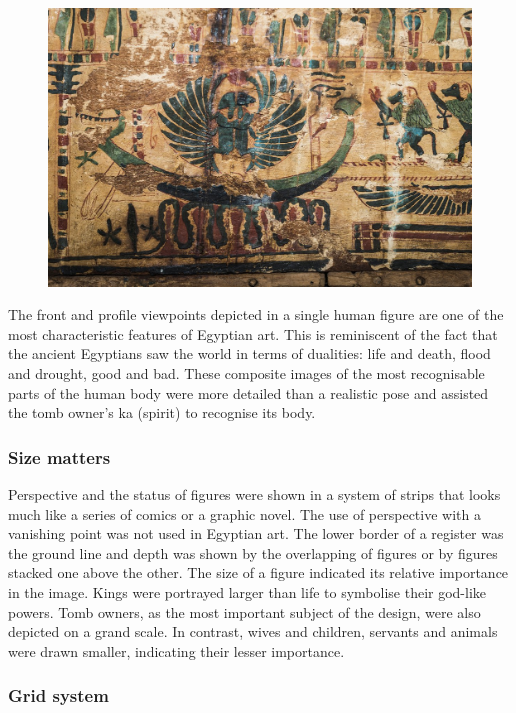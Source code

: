 	\begin{figure}
		\centering
		\includegraphics[width=1.0\linewidth]{egypt}
	\end{figure}
	The front and profile viewpoints depicted in a single human figure are one of the most characteristic features of Egyptian art. This is reminiscent of the fact that the ancient Egyptians saw the world in terms of dualities: life and death, flood and drought, good and bad. These composite images of the most recognisable parts of the human body were more detailed than a realistic pose and assisted the tomb owner’s ka (spirit) to recognise its body.

	\subsubsection{Size matters}
	
	Perspective and the status of figures were shown in a system of strips that looks much like a series of comics or a graphic novel. The use of perspective with a vanishing point was not used in Egyptian art. The lower border of a register was the ground line and depth was shown by the overlapping of figures or by figures stacked one above the other. The size of a figure indicated its relative importance in the image. Kings were portrayed larger than life to symbolise their god-like powers. Tomb owners, as the most important subject of the design, were also depicted on a grand scale. In contrast, wives and children, servants and animals were drawn smaller, indicating their lesser importance.
	
	\subsubsection{Grid system}
	
